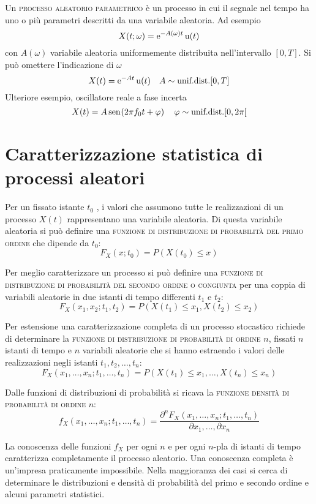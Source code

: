 Un \textsc{processo aleatorio parametrico} è un processo in cui il segnale nel tempo ha uno o più parametri descritti da una variabile aleatoria. Ad esempio
\[X(t;\omega)=\operatorname{e}^{-A(\omega)t}\operatorname{u}(t)\]
con $A(\omega)$ variabile aleatoria uniformemente distribuita nell'intervallo $[0,T]$.
Si può omettere l'indicazione di $\omega$
\[X(t)=\operatorname{e}^{-A t}\operatorname{u}(t)\quad A\sim\text{unif.dist.} [0,T]\]
Ulteriore esempio, oscillatore reale a fase incerta
\[X(t)=A\,{\operatorname{sen}}^{}\!\left({2\pi f_0 t+\varphi}\right)\quad \varphi\sim\text{unif.dist.} [0,2\pi[\]

\section{Caratterizzazione statistica di processi aleatori}
Per un fissato istante $t_0$ , i valori che assumono tutte le realizzazioni di un processo $X(t)$ rappresentano una variabile aleatoria. Di questa variabile aleatoria si può definire una \textsc{funzione di distribuzione di probabilità del primo ordine} che dipende da $t_0$:
\begin{equation}
F_X(x;t_0)=P(X(t_0)\leq x)
\end{equation}

Per meglio caratterizzare un processo si può definire una \textsc{funzione di distribuzione di probabilità del secondo ordine o congiunta} per una coppia di variabili aleatorie in due istanti di tempo differenti $t_1$ e $t_2$:
\begin{equation}
F_X(x_1,x_2;t_1,t_2)=P(X(t_1)\leq x_1,X(t_2)\leq x_2)
\end{equation}

Per estensione una caratterizzazione completa di un processo stocastico richiede di determinare la \textsc{funzione di distribuzione di probabilità di ordine $n$}, fissati $n$ istanti di tempo e $n$ variabili aleatorie che si hanno estraendo i valori delle realizzazioni negli istanti $t_1,t_2,\dots,t_n$:
\begin{equation}
F_X(x_1,\dots,x_n;t_1,\dots,t_n)=P(X(t_1)\leq x_1,\dots,X(t_n)\leq x_n)
\end{equation}

Dalle funzioni di distribuzioni di probabilità si ricava la \textsc{funzione densità di probabilità di ordine $n$}:
\begin{equation}
f_X(x_1,\dots,x_n;t_1,\dots,t_n)=\frac{\partial^n F_X(x_1,\dots,x_n;t_1,\dots,t_n)}{\partial x_1,\dots,\partial x_n}
\end{equation}

La conoscenza delle funzioni $f_X$ per ogni $n$ e per ogni $n$-pla di istanti di tempo caratterizza completamente il processo aleatorio. Una conoscenza completa è un'impresa praticamente impossibile. Nella maggioranza dei casi si cerca di determinare le distribuzioni e densità di probabilità del primo e secondo ordine e alcuni parametri statistici.

